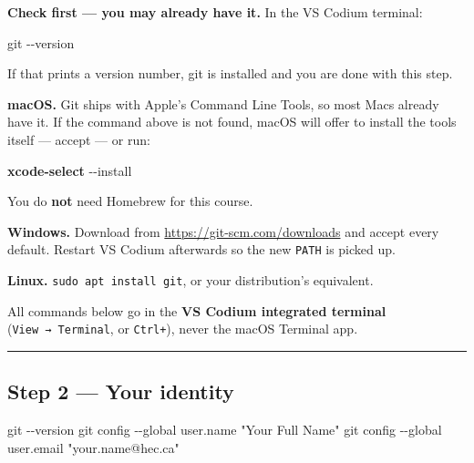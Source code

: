 \documentclass[
  letterpaper,
  10pt,
  twoside,
  openright,
  numbers=noenddot,
  chapterprefix=true]{scrbook}
\newenvironment{Shaded}{}{}
\newcommand{\AttributeTok}[1]{\textcolor[rgb]{0.84,0.23,0.29}{#1}}
\newcommand{\ExtensionTok}[1]{\textcolor[rgb]{0.84,0.23,0.29}{\textbf{#1}}}
\newcommand{\FunctionTok}[1]{\textcolor[rgb]{0.44,0.26,0.76}{#1}}
\newcommand{\NormalTok}[1]{\textcolor[rgb]{0.14,0.16,0.18}{#1}}
\newcommand{\StringTok}[1]{\textcolor[rgb]{0.01,0.18,0.38}{#1}}
\begin{document}
\textbf{Check first --- you may already have it.} In the VS Codium
terminal:

\begin{Shaded}
\begin{Highlighting}[]
\FunctionTok{git} \AttributeTok{{-}{-}version}
\end{Highlighting}
\end{Shaded}

If that prints a version number, git is installed and you are done with
this step.

\textbf{macOS.} Git ships with Apple's Command Line Tools, so most Macs
already have it. If the command above is not found, macOS will offer to
install the tools itself --- accept --- or run:

\begin{Shaded}
\begin{Highlighting}[]
\ExtensionTok{xcode{-}select} \AttributeTok{{-}{-}install}
\end{Highlighting}
\end{Shaded}

You do \textbf{not} need Homebrew for this course.

\textbf{Windows.} Download from \url{https://git-scm.com/downloads} and
accept every default. Restart VS Codium afterwards so the new
\texttt{PATH} is picked up.

\textbf{Linux.} \texttt{sudo\ apt\ install\ git}, or your distribution's
equivalent.

All commands below go in the \textbf{VS Codium integrated terminal}
(\texttt{View\ →\ Terminal}, or \texttt{Ctrl+\textasciigrave{}}), never
the macOS Terminal app.

\begin{center}\rule{0.5\linewidth}{0.5pt}\end{center}

\subsection{Step 2 --- Your identity}\label{step-2-your-identity}

\begin{Shaded}
\begin{Highlighting}[]
\FunctionTok{git} \AttributeTok{{-}{-}version}
\FunctionTok{git}\NormalTok{ config }\AttributeTok{{-}{-}global}\NormalTok{ user.name  }\StringTok{"Your Full Name"}
\FunctionTok{git}\NormalTok{ config }\AttributeTok{{-}{-}global}\NormalTok{ user.email }\StringTok{"your.name@hec.ca"}
\end{Highlighting}
\end{Shaded}
\end{document}

